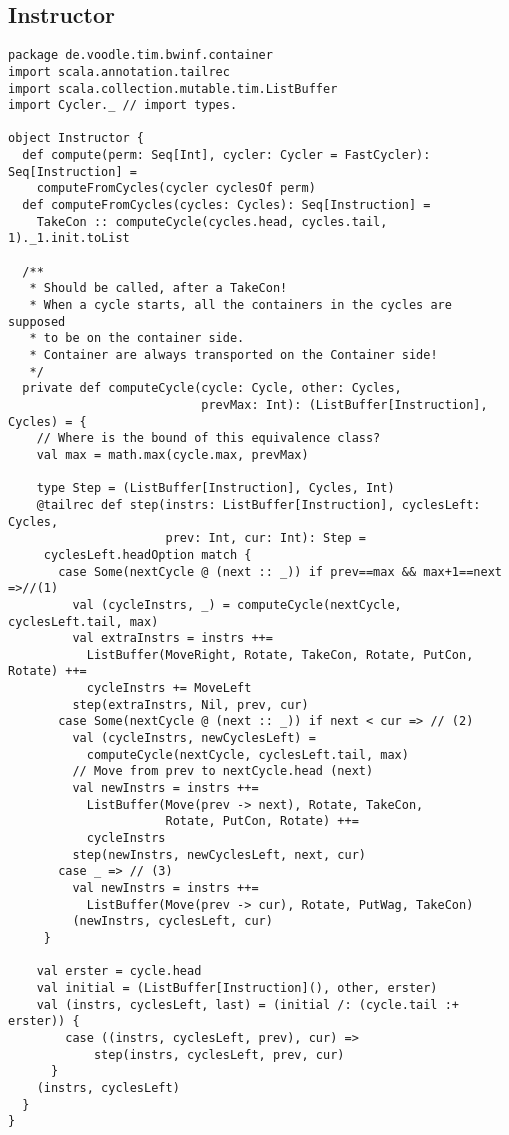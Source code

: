 \subsection{Instructor}
\begin{lstlisting}
package de.voodle.tim.bwinf.container
import scala.annotation.tailrec
import scala.collection.mutable.tim.ListBuffer
import Cycler._ // import types.

object Instructor {
  def compute(perm: Seq[Int], cycler: Cycler = FastCycler): Seq[Instruction] =
    computeFromCycles(cycler cyclesOf perm)
  def computeFromCycles(cycles: Cycles): Seq[Instruction] =
    TakeCon :: computeCycle(cycles.head, cycles.tail, 1)._1.init.toList

  /**
   * Should be called, after a TakeCon!
   * When a cycle starts, all the containers in the cycles are supposed
   * to be on the container side.
   * Container are always transported on the Container side!
   */
  private def computeCycle(cycle: Cycle, other: Cycles,
                           prevMax: Int): (ListBuffer[Instruction], Cycles) = {
    // Where is the bound of this equivalence class?
    val max = math.max(cycle.max, prevMax)

    type Step = (ListBuffer[Instruction], Cycles, Int)
    @tailrec def step(instrs: ListBuffer[Instruction], cyclesLeft: Cycles,
                      prev: Int, cur: Int): Step =
     cyclesLeft.headOption match {
       case Some(nextCycle @ (next :: _)) if prev==max && max+1==next =>//(1)
         val (cycleInstrs, _) = computeCycle(nextCycle, cyclesLeft.tail, max)
         val extraInstrs = instrs ++=
           ListBuffer(MoveRight, Rotate, TakeCon, Rotate, PutCon, Rotate) ++=
           cycleInstrs += MoveLeft
         step(extraInstrs, Nil, prev, cur)
       case Some(nextCycle @ (next :: _)) if next < cur => // (2)
         val (cycleInstrs, newCyclesLeft) =
           computeCycle(nextCycle, cyclesLeft.tail, max)
         // Move from prev to nextCycle.head (next)
         val newInstrs = instrs ++=
           ListBuffer(Move(prev -> next), Rotate, TakeCon,
                      Rotate, PutCon, Rotate) ++=
           cycleInstrs
         step(newInstrs, newCyclesLeft, next, cur)
       case _ => // (3)
         val newInstrs = instrs ++=
           ListBuffer(Move(prev -> cur), Rotate, PutWag, TakeCon)
         (newInstrs, cyclesLeft, cur)
     }

    val erster = cycle.head
    val initial = (ListBuffer[Instruction](), other, erster)
    val (instrs, cyclesLeft, last) = (initial /: (cycle.tail :+ erster)) {
        case ((instrs, cyclesLeft, prev), cur) =>
            step(instrs, cyclesLeft, prev, cur)
      }
    (instrs, cyclesLeft)
  }
}
\end{lstlisting}
\clearpage
